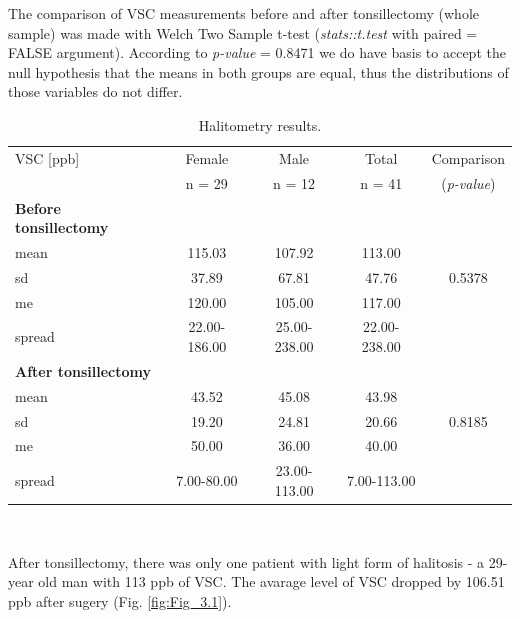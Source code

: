 \documentclass[12pt,a4paper,notitlepage]{report}
\begin{document}
The comparison of VSC measurements before and after tonsillectomy (whole sample) was made with Welch Two Sample t-test (\textit{stats::t.test} with paired = FALSE argument). According to \textit{p-value} = 0.8471 we do have basis to accept the null hypothesis that the means in both groups are equal, thus the distributions of those variables do not differ. 

\begin{table}[H]
\centering
	\begin{tabular}{lcccc}
	\hline VSC [ppb] 				& Female 	& Male 		& Total 		&  Comparison  \\
	 		 					& n = 29 	& n = 12	& n = 41	&  (\textit{p-value}) \\
	\hline
	\bf{Before tonsillectomy}		&			&			&			&		\\
	\indent mean					& 115.03	& 107.92	& 113.00	& 		\\
	\indent sd					& 37.89		& 67.81		& 47.76		& 0.5378 \\
	\indent me					& 120.00	& 105.00	& 117.00	& 		\\
	\indent spread				& 22.00-186.00 & 25.00-238.00 & 22.00-238.00	 & \\
	\hline
	
	\bf{After tonsillectomy}		&			&			&			&		\\
	\indent mean					& 43.52		& 45.08		& 43.98		& 		\\
	\indent sd					& 19.20		& 24.81		& 20.66		& 0.8185 \\
	\indent me					& 50.00		& 36.00		& 40.00 		& 		\\
	\indent spread				& 7.00-80.00 & 23.00-113.00	& 7.00-113.00 & \\
	\hline
	
	\end{tabular} \\ 
	\caption{Halitometry results.}
	\label{tab:Halitometry_results}
\end{table}

After tonsillectomy, there was only one patient with light form of halitosis - a 29-year old man with 113 ppb of VSC.
The avarage level of VSC dropped by 106.51 ppb after sugery (Fig. \ref{fig:Fig_3.1}).
\end{document}
